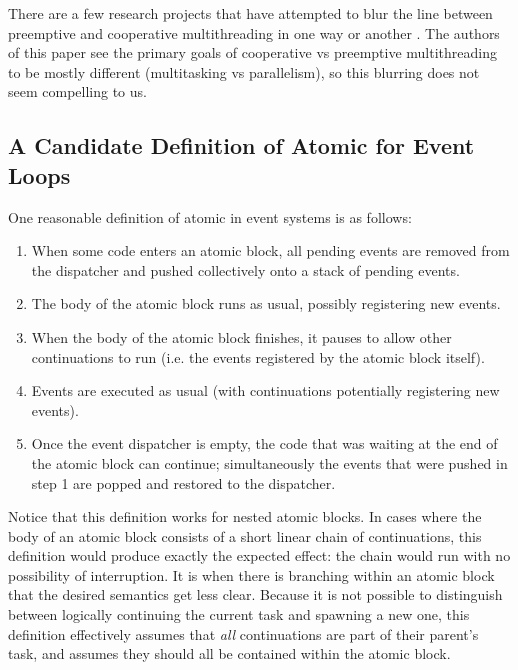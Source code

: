 \documentclass[acmsmall,anonymous,review]{acmart}\settopmatter{printfolios=true,printccs=false,printacmref=false}
\begin{document}
There are a few research projects that have attempted to blur the line between preemptive and cooperative multithreading in one way or another \cite{ONeill2015, Boussinot2006, Dabrowski2006}.
The authors of this paper see the primary goals of cooperative vs preemptive multithreading to be mostly different (multitasking vs parallelism), so this blurring does not seem compelling to us.

\subsection{A Candidate Definition of Atomic for Event Loops} \label{sec:candidate_atomic}

One reasonable definition of atomic in event systems is as follows:


\begin{enumerate}
\item When some code enters an atomic block, all pending events are removed from the dispatcher and pushed collectively onto a stack of pending events.
\item The body of the atomic block runs as usual, possibly registering new events.
\item When the body of the atomic block finishes, it pauses to allow other continuations to run (i.e. the events registered by the atomic block itself).
\item Events are executed as usual (with continuations potentially registering new events).
\item Once the event dispatcher is empty, the code that was waiting at the end of the atomic block can continue; simultaneously the events that were pushed in step 1 are popped and restored to the dispatcher.
\end{enumerate}

Notice that this definition works for nested atomic blocks.
In cases where the body of an atomic block consists of a short linear chain of continuations, this definition would produce exactly the expected effect: the chain would run with no possibility of interruption.
It is when there is branching within an atomic block that the desired semantics get less clear.
Because it is not possible to distinguish between logically continuing the current task and spawning a new one, this definition effectively assumes that \emph{all} continuations are part of their parent's task, and assumes they should all be contained within the atomic block.
\end{document}
